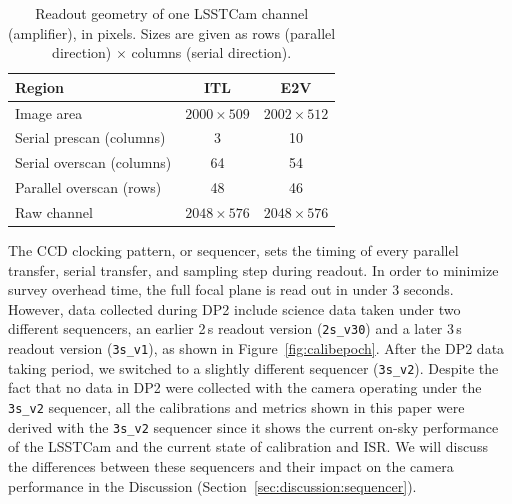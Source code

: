 \begin{table}[t]
    \centering
    \small
    \caption{Readout geometry of one LSSTCam channel (amplifier), in pixels.
    Sizes are given as rows (parallel direction) $\times$ columns (serial direction).}
    \label{tab:amp-geometry}
    \begin{tabular}{lcc}
        \hline
        Region & ITL & E2V \\
        \hline
        Image area & $2000 \times 509$ & $2002 \times 512$ \\
        Serial prescan (columns) & 3 & 10 \\
        Serial overscan (columns) & 64 & 54 \\
        Parallel overscan (rows) & 48 & 46 \\
        \hline
        Raw channel & $2048 \times 576$ & $2048 \times 576$ \\
        \hline
    \end{tabular}
\end{table}

The CCD clocking pattern, or sequencer, sets the timing of every parallel transfer, serial transfer, and sampling step during readout.
In order to minimize survey overhead time, the full focal plane is read out in under 3 seconds. However, data collected during DP2
include science data taken under two different sequencers, an earlier 2\,s readout version (\texttt{2s\_v30}) and a later 3\,s readout version (\texttt{3s\_v1}), as shown in Figure~\ref{fig:calibepoch}.
After the DP2 data taking period, we switched to a slightly different sequencer (\texttt{3s\_v2}). Despite the fact that no data in DP2 were collected with the camera operating under the \texttt{3s\_v2}
sequencer, all the calibrations and metrics shown in this paper were derived with the \texttt{3s\_v2} sequencer since it shows the current on-sky performance of the LSSTCam and the current state of calibration and ISR.
We will discuss the differences between these sequencers and their impact on the camera performance in the Discussion (Section~\ref{sec:discussion:sequencer}).

